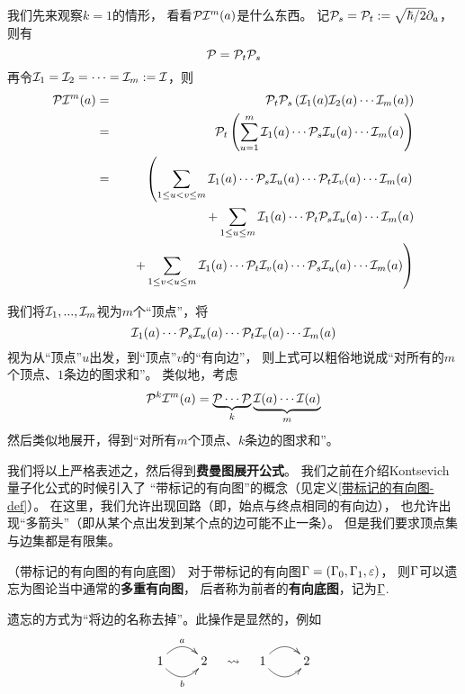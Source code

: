 我们先来观察$k=1$的情形，
看看$\mathcal{P}\mathcal{I}^m(a)$是什么东西。
记$\mathcal{P}_s=\mathcal{P}_t:=\sqrt{\hbar/2}\partial_{a}$，则有
$$\mathcal{P}=\mathcal{P}_t\mathcal{P}_s$$
再令$\mathcal{I}_1=\mathcal{I}_2=\cdots=\mathcal{I}_m:=\mathcal{I}$，则
\begin{eqnarray*}
     \mathcal{P}\mathcal{I}^m(a)
&=&
     \mathcal{P}_t\mathcal{P}_s
     \left(
       \mathcal{I}_1(a)\mathcal{I}_2(a)\cdots\mathcal{I}_m(a)
     \right)\\
&=&
     \mathcal{P}_t
     \left(
       \sum_{u=1}^m
         \mathcal{I}_1(a)\cdots\mathcal{P}_s\mathcal{I}_u(a)\cdots\mathcal{I}_m(a)
     \right)\\
&=&
     \left(
       \sum_{1\leq u<v\leq m}
         \mathcal{I}_1(a)\cdots\mathcal{P}_s\mathcal{I}_u(a)
         \cdots\mathcal{P}_t\mathcal{I}_v(a)\cdots\mathcal{I}_m(a)
     \right.\\
& &
      \quad
      +\sum_{1\leq u\leq m}
         \mathcal{I}_1(a)\cdots\mathcal{P}_t\mathcal{P}_s\mathcal{I}_u(a)
         \cdots\mathcal{I}_m(a)\\
& &
      \quad
      \left.
      +\sum_{1\leq v<u\leq m}
         \mathcal{I}_1(a)\cdots\mathcal{P}_t\mathcal{I}_v(a)
         \cdots\mathcal{P}_s\mathcal{I}_u(a)\cdots\mathcal{I}_m(a)
     \right)
\end{eqnarray*}

我们将$\mathcal{I}_1,...,\mathcal{I}_m$视为$m$个“顶点”，将
$$\mathcal{I}_1(a)\cdots\mathcal{P}_s\mathcal{I}_u(a)
\cdots\mathcal{P}_t\mathcal{I}_v(a)\cdots\mathcal{I}_m(a)$$
视为从“顶点”$u$出发，到“顶点”$v$的“有向边”，
则上式可以粗俗地说成“对所有的$m$个顶点、$1$条边的图求和”。
类似地，考虑
$$\mathcal{P}^k\mathcal{I}^m(a)=\underbrace{\mathcal{P}\cdots\mathcal{P}}_{k}
\underbrace{\mathcal{I}(a)\cdots\mathcal{I}(a)}_m$$
然后类似地展开，得到“对所有$m$个顶点、$k$条边的图求和”。

我们将以上严格表述之，然后得到\textbf{费曼图展开公式}。
我们之前在介绍Kontsevich量子化公式的时候引入了
“带标记的有向图”的概念（见定义\ref{带标记的有向图-def}）。
在这里，我们允许出现回路（即，始点与终点相同的有向边），
也允许出现“多箭头”（即从某个点出发到某个点的边可能不止一条）。
但是我们要求顶点集与边集都是有限集。

\begin{notation}（带标记的有向图的有向底图）
对于带标记的有向图$\Gamma=(\Gamma_0,\Gamma_1,\varepsilon)$，
则$\Gamma$可以遗忘为图论当中通常的\textbf{多重有向图}，
后者称为前者的\textbf{有向底图}，记为$\underline{\Gamma}$.
\end{notation}

遗忘的方式为“将边的名称去掉”。此操作是显然的，例如
$$
  \xymatrix{
     1 \ar@/^1pc/[r]^{a}  \ar@/_1pc/[r]_{b}
   & 2
  }
\quad
\rightsquigarrow
\quad
  \xymatrix{
     1 \ar@/^1pc/[r]     \ar@/_1pc/[r]
   & 2
  }
$$

